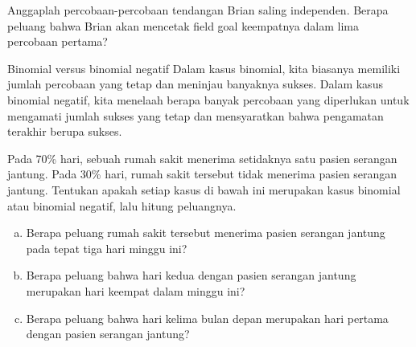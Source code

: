 \begin{exercisewrap}
\begin{nexercise}
Anggaplah percobaan-percobaan tendangan Brian saling independen. Berapa peluang bahwa Brian akan mencetak field goal keempatnya dalam lima percobaan pertama?\footnotemark
\end{nexercise}
\end{exercisewrap}

\D{\newpage}

\begin{onebox}{Binomial versus binomial negatif}
  Dalam kasus binomial, kita biasanya memiliki jumlah percobaan
  yang tetap dan meninjau banyaknya sukses.
  Dalam kasus binomial negatif, kita menelaah berapa banyak percobaan
  yang diperlukan untuk mengamati jumlah sukses yang tetap dan
  mensyaratkan bahwa pengamatan terakhir berupa sukses.
\end{onebox}

\begin{exercisewrap}
\begin{nexercise}
Pada 70\% hari, sebuah rumah sakit menerima setidaknya satu pasien serangan jantung. Pada 30\% hari, rumah sakit tersebut tidak menerima pasien serangan jantung. Tentukan apakah setiap kasus di bawah ini merupakan kasus binomial atau binomial negatif, lalu hitung peluangnya.\footnotemark
\begin{enumerate}[(a)]
\setlength{\itemsep}{0mm}
\item Berapa peluang rumah sakit tersebut menerima
    pasien serangan jantung pada tepat tiga hari minggu ini?

\item Berapa peluang bahwa hari kedua dengan pasien
    serangan jantung merupakan hari keempat dalam minggu ini?

\item Berapa peluang bahwa hari kelima bulan depan
    merupakan hari pertama dengan pasien serangan jantung?
\end{enumerate}
\end{nexercise}
\end{exercisewrap}

